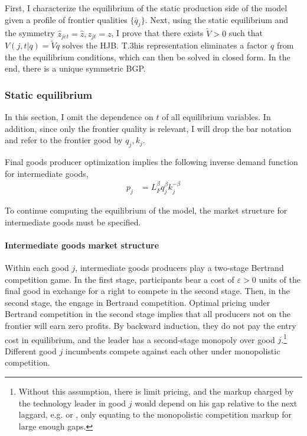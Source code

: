 \documentclass[11pt,english]{article}
\begin{document}
First, I characterize the equilibrium of the static production side of the model given a profile of frontier qualities $\{ \bar{q}_{j}\}$. Next, using the static equilibrium and the symmetry $\hat{z}_{jet} = \hat{z}, z_{jt} = z$, I prove that there exists $\tilde{V} > 0$ such that $V(j,t|q) = \tilde{V} q$ solves the HJB. T.3his representation eliminates a factor $q$ from the the equilibrium conditions, which can then be solved in closed form. In the end, there is a unique symmetric BGP. 

\subsubsection{Static equilibrium}

In this section, I omit the dependence on $t$ of all equilibrium variables. In addition, since only the frontier quality is relevant, I will drop the bar notation and refer to the frontier good by $q_j, k_j$.

Final goods producer optimization implies the following inverse demand function for intermediate goods, 
\begin{align*}
p_j &= L_F^{\beta} q_j^{\beta} k_j^{-\beta}	
\end{align*}

To continue computing the equilibrium of the model, the market structure for intermediate goods must be specified. 

\paragraph{Intermediate goods market structure} Within each good $j$, intermediate goods producers play a two-stage Bertrand competition game. In the first stage, participants bear a cost of $\varepsilon > 0$ units of the final good in exchange for a right to compete in the second stage. Then, in the second stage, the engage in Bertrand competition. Optimal pricing under Bertrand competition in the second stage implies that all producers not on the frontier will earn zero profits. By backward induction, they do not pay the entry cost in equilibrium, and the leader has a second-stage monopoly over good $j$.\footnote{Without this assumption, there is limit pricing, and the markup charged by the technology leader in good $j$ would depend on his gap relative to the next laggard, e.g. \cite{baslandze_spinout_2019} or \cite{aghion_competition_2005}, only equating to the monopolistic competition markup for large enough gaps.} Different good $j$ incumbents compete against each other under monopolistic competition.
\end{document}
